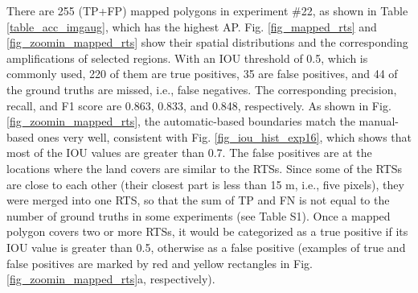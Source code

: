 \documentclass[authoryear,preprint,review,12pt]{elsarticle}
\begin{document}
There are 255 (TP+FP) mapped polygons in experiment \#22, as shown in Table \ref{table_acc_imgaug}, which has the highest AP.  Fig. \ref{fig_mapped_rts} and \ref{fig_zoomin_mapped_rts} show their spatial distributions and the corresponding ampliﬁcations of selected regions. With an IOU threshold of 0.5, which is commonly used, 220 of them are true positives, 35 are false positives, and 44 of the ground truths are missed, i.e., false negatives. The corresponding precision, recall, and F1 score are 0.863, 0.833, and 0.848, respectively. As shown in Fig. \ref{fig_zoomin_mapped_rts}, the automatic-based boundaries match the manual-based ones very well, consistent with Fig. \ref{fig_iou_hist_exp16}, which shows that most of the IOU values are greater than 0.7. The false positives are at the locations where the land covers are similar to the RTSs. Since some of the RTSs are close to each other (their closest part is less than 15 m, i.e., five pixels), they were merged into one RTS,
so that the sum of TP and FN is not equal to the number of ground truths in some experiments (see Table S1). Once a mapped polygon covers two or more RTSs, it would be categorized as a true positive if its IOU value is greater than 0.5, otherwise as a false positive (examples of true and false positives are marked by red and yellow rectangles in Fig. \ref{fig_zoomin_mapped_rts}a, respectively). 

\end{document}
